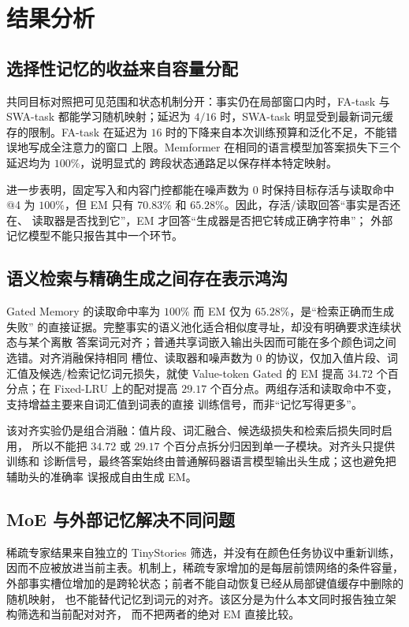 \documentclass[letterpaper]{article}
\begin{document}
\FloatBarrier

\section{结果分析}

\subsection{选择性记忆的收益来自容量分配}

共同目标对照把可见范围和状态机制分开：事实仍在局部窗口内时，FA-task 与 SWA-task
都能学习随机映射；延迟为 $4/16$ 时，SWA-task 明显受到最新词元缓存的限制。FA-task
在延迟为 $16$ 时的下降来自本次训练预算和泛化不足，不能错误地写成全注意力的窗口
上限。Memformer 在相同的语言模型加答案损失下三个延迟均为 $100\%$，说明显式的
跨段状态通路足以保存样本特定映射。

进一步表明，固定写入和内容门控都能在噪声数为 0 时保持目标存活与读取命中@4 为
$100\%$，但 EM 只有 $70.83\%$ 和 $65.28\%$。因此，存活/读取回答“事实是否还在、
读取器是否找到它”，EM 才回答“生成器是否把它转成正确字符串”；
外部记忆模型不能只报告其中一个环节。

\subsection{语义检索与精确生成之间存在表示鸿沟}

Gated Memory 的读取命中率为 $100\%$ 而 EM 仅为 $65.28\%$，是“检索正确而生成失败”
的直接证据。完整事实的语义池化适合相似度寻址，却没有明确要求连续状态与某个离散
答案词元对齐；普通共享词嵌入输出头因而可能在多个颜色词之间选错。对齐消融保持相同
槽位、读取器和噪声数为 0 的协议，仅加入值片段、词汇值及候选/检索记忆词元损失，就使
Value-token Gated 的 EM 提高 $34.72$ 个百分点；在 Fixed-LRU 上的配对提高
$29.17$ 个百分点。两组存活和读取命中不变，支持增益主要来自词汇值到词表的直接
训练信号，而非“记忆写得更多”。

该对齐实验仍是组合消融：值片段、词汇融合、候选级损失和检索后损失同时启用，
所以不能把 $34.72$ 或 $29.17$ 个百分点拆分归因到单一子模块。对齐头只提供训练和
诊断信号，最终答案始终由普通解码器语言模型输出头生成；这也避免把辅助头的准确率
误报成自由生成 EM。

\subsection{MoE 与外部记忆解决不同问题}

稀疏专家结果来自独立的 TinyStories 筛选，并没有在颜色任务协议中重新训练，
因而不应被放进当前主表。机制上，稀疏专家增加的是每层前馈网络的条件容量，
外部事实槽位增加的是跨轮状态；前者不能自动恢复已经从局部键值缓存中删除的随机映射，
也不能替代记忆到词元的对齐。该区分是为什么本文同时报告独立架构筛选和当前配对对齐，
而不把两者的绝对 EM 直接比较。
\end{document}
